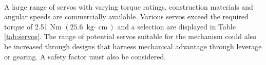 \\
A large range of servos with varying torque ratings, construction materials and angular speeds are commercially available. Various servos exceed the required torque of 2.51 Nm \((25.6\text{ kg$\cdot$ cm})\) and a selection are displayed in Table \ref{tab:servos}. The range of potential servos suitable for the mechanism could also be increased through designs that harness mechanical advantage through leverage or gearing. A safety factor must also be considered.\\

\begin{table}[H]
\caption{Potential Servos for Tilt Wing Mechanism}
\label{tab:servos}
\centering
{}
\end{table}
\\
